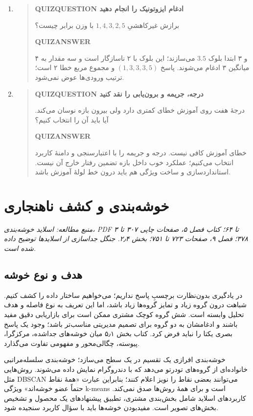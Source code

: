 \begin{enumerate}
\begin{quote}
\end{quote}
\item\begin{quote}\textbf{QUIZQUESTION ادغام ایزوتونیک را انجام دهید}\par 
برازش غیرکاهشیِ $1,4,3,2,5$ با وزن برابر چیست؟
\par\textbf{QUIZANSWER}\par ۴ و ۳ ابتدا بلوک $3.5$ می‌سازند؛ این بلوک با ۲ ناسازگار است و سه مقدار به میانگین ۳ ادغام می‌شوند. پاسخ $(1,3,3,3,5)$ و مجموع مربع خطا ۲ است؛ ترتیب ورودی‌ها عوض نمی‌شود.\par 
\end{quote}
\item\begin{quote}\textbf{QUIZQUESTION درجه، جریمه و برون‌یابی را نقد کنید}\par 
درجهٔ هفت روی آموزش خطای کمتری دارد ولی بیرون بازه نوسان می‌کند. آیا باید آن را انتخاب کنیم؟
\par\textbf{QUIZANSWER}\par خطای آموزش کافی نیست. درجه و جریمه را با اعتبارسنجی و دامنهٔ کاربرد انتخاب می‌کنیم؛ عملکرد خوب داخل بازه تضمین رفتار خارج آن نیست. استانداردسازی و ساخت ویژگی هم باید درون خط لولهٔ آموزش باشد.\par 
\end{quote}
\end{enumerate}


\chapter{خوشه‌بندی و کشف ناهنجاری}
\textit{منبع مطالعه: اسلاید خوشه‌بندی، PDF ۳ تا ۶۴؛ کتاب فصل ۵، صفحات چاپی ۳۰۷ تا ۳۷۸؛ فصل ۹، صفحات ۷۲۳ تا ۷۵۱؛ بخش ۲٫۴. جنگل جداسازی از اسلایدها توضیح داده شده است.}\par 
\section{هدف و نوع خوشه}

در یادگیری بدون‌نظارت برچسبِ پاسخ نداریم؛ می‌خواهیم ساختار داده را کشف کنیم. شباهت درون گروه زیاد و تمایز گروه‌ها زیاد باشد، اما این تعریف به نوع فاصله و هدف تحلیل وابسته است. شش گروه کوچک مشتری ممکن است برای بازاریابی دقیق مفید باشند و ادغامشان به دو گروه برای تصمیم مدیریتی مناسب‌تر باشد؛ وجود یک پاسخ بصری یکتا را نباید فرض کرد. کتاب بخش ۵٫۱ میان خوشه‌های جداشده، مرکزگرا، پیوسته، چگالی‌محور و مفهومی تفاوت می‌گذارد.

خوشه‌بندی افرازی یک تقسیم در یک سطح می‌سازد؛ خوشه‌بندی سلسله‌مراتبی خانواده‌ای از گروه‌های تودرتو می‌دهد که با دندروگرام نمایش داده می‌شوند. روش‌هایی مثل DBSCAN می‌توانند بعضی نقاط را نویز اعلام کنند؛ بنابراین عبارت «همهٔ نقاط حتماً عضو خوشه‌اند» ویژگی k-means است و برای همهٔ روش‌ها صدق نمی‌کند. کاربردهای اسلاید شامل بخش‌بندی مشتری، تطبیق پیشنهادهای یک محصول و تشخیص بخش‌های تصویر است. مفیدبودن خوشه‌ها باید با سؤال کاربرد سنجیده شود.

